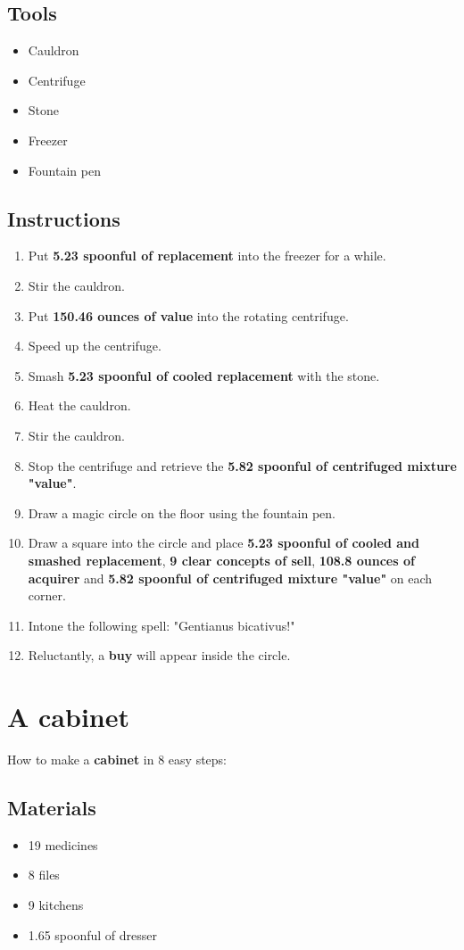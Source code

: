 \documentclass{article}
\begin{document}
\subsection{Tools}\begin{itemize}
\item 
Cauldron
\item 
Centrifuge
\item 
Stone
\item 
Freezer
\item 
Fountain pen
\end{itemize}
\subsection{Instructions}\begin{enumerate}
\item 
Put \textbf{5.23 spoonful of replacement} into the freezer for a while.
\item 
Stir the cauldron.
\item 
Put \textbf{150.46 ounces of value} into the rotating centrifuge.
\item 
Speed up the centrifuge.
\item 
Smash \textbf{5.23 spoonful of cooled replacement} with the stone.
\item 
Heat the cauldron.
\item 
Stir the cauldron.
\item 
Stop the centrifuge and retrieve the \textbf{5.82 spoonful of centrifuged mixture "value"}.
\item 
Draw a magic circle on the floor using the fountain pen.
\item 
Draw a square into the circle and place \textbf{5.23 spoonful of cooled and smashed replacement}, \textbf{9 clear concepts of sell}, \textbf{108.8 ounces of acquirer} and \textbf{5.82 spoonful of centrifuged mixture "value"} on each corner.
\item 
Intone the following spell: "Gentianus bicativus!"
\item 
Reluctantly, a \textbf{buy} will appear inside the circle.
\end{enumerate}
\newpage
\section{A cabinet}How to make a \textbf{cabinet} in 8 easy steps:

\subsection{Materials}\begin{itemize}
\item 
19 medicines
\item 
8 files
\item 
9 kitchens
\item 
1.65 spoonful of dresser
\end{itemize}
\end{document}
